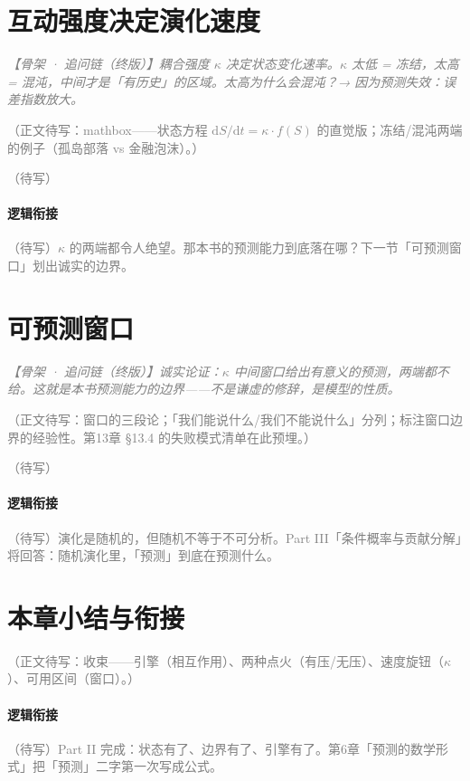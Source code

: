 \documentclass[../../main2.tex]{subfiles}
\begin{document}
	\section{互动强度决定演化速度}
	\label{sec:evo-kappa}

	\textcolor{gray}{\textit{【骨架 · 追问链（终版）】耦合强度 $\kappa$ 决定状态变化速率。$\kappa$ 太低 = 冻结，太高 = 混沌，中间才是「有历史」的区域。太高为什么会混沌？→ 因为预测失效：误差指数放大。}}

	\textcolor{gray}{（正文待写：mathbox——状态方程 $\mathrm{d}S/\mathrm{d}t = \kappa \cdot f(S)$ 的直觉版；冻结/混沌两端的例子（孤岛部落 vs 金融泡沫）。）}

	\begin{readingnote}
		\textcolor{gray}{（待写）}
	\end{readingnote}

	\paragraph*{逻辑衔接}
	\textcolor{gray}{（待写）$\kappa$ 的两端都令人绝望。那本书的预测能力到底落在哪？下一节「可预测窗口」划出诚实的边界。}

	\section{可预测窗口}
	\label{sec:evo-window}

	\textcolor{gray}{\textit{【骨架 · 追问链（终版）】诚实论证：$\kappa$ 中间窗口给出有意义的预测，两端都不给。这就是本书预测能力的边界——不是谦虚的修辞，是模型的性质。}}

	\textcolor{gray}{（正文待写：窗口的三段论；「我们能说什么/我们不能说什么」分列；\lowfreq 标注窗口边界的经验性。第13章 §13.4 的失败模式清单在此预埋。）}

	\begin{readingnote}
		\textcolor{gray}{（待写）}
	\end{readingnote}

	\paragraph*{逻辑衔接}
	\textcolor{gray}{（待写）演化是随机的，但随机不等于不可分析。Part III「条件概率与贡献分解」将回答：随机演化里，「预测」到底在预测什么。}

	\section{本章小结与衔接}
	\label{sec:evo-summary}

	\textcolor{gray}{（正文待写：收束——引擎（相互作用）、两种点火（有压/无压）、速度旋钮（$\kappa$）、可用区间（窗口）。）}

	\paragraph*{逻辑衔接}
	\textcolor{gray}{（待写）Part II 完成：状态有了、边界有了、引擎有了。第6章「预测的数学形式」把「预测」二字第一次写成公式。}
\end{document}
